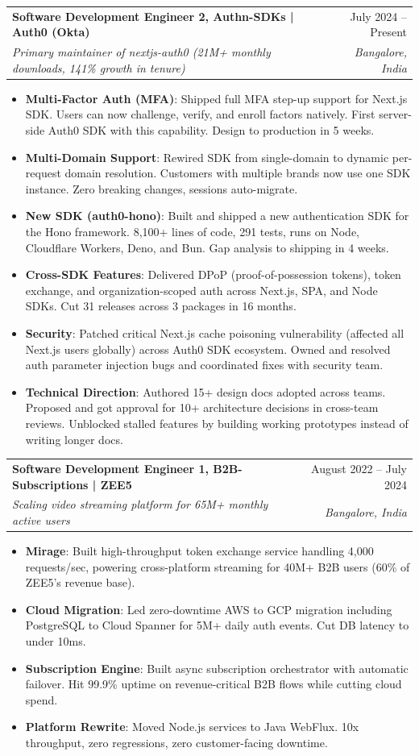 \documentclass[letterpaper,10pt]{article}
\makeatletter
\newcommand{\resumeItem}[1]{
  \item\small{
{#1 \vspace{-1pt}}
  }
}
\newcommand{\resumeSubheading}[4]{
  \vspace{3pt}\item
\begin{tabular*}{0.97\textwidth}[t]{l@{\extracolsep{\fill}}r}
  \textbf{#1} & #2 \\
  \textit{\small#3} & \textit{\small #4} \\
\end{tabular*}\vspace{-7pt}
}
\newcommand{\resumeItemListStart}{\begin{itemize}}
\newcommand{\resumeItemListEnd}{\end{itemize}\vspace{-8pt}}
\makeatother
\begin{document}
    \resumeSubheading
  {Software Development Engineer 2, Authn-SDKs | Auth0 (Okta)}{July 2024 -- Present}
  {Primary maintainer of nextjs-auth0 (21M+ monthly downloads, 141\% growth in tenure)}{Bangalore, India}
  \resumeItemListStart
    \resumeItem{\textbf{Multi-Factor Auth (MFA)}: Shipped full MFA step-up support for Next.js SDK. Users can now challenge, verify, and enroll factors natively. First server-side Auth0 SDK with this capability. Design to production in 5 weeks.}
    \resumeItem{\textbf{Multi-Domain Support}: Rewired SDK from single-domain to dynamic per-request domain resolution. Customers with multiple brands now use one SDK instance. Zero breaking changes, sessions auto-migrate.}
    \resumeItem{\textbf{New SDK (auth0-hono)}: Built and shipped a new authentication SDK for the Hono framework. 8,100+ lines of code, 291 tests, runs on Node, Cloudflare Workers, Deno, and Bun. Gap analysis to shipping in 4 weeks.}
    \resumeItem{\textbf{Cross-SDK Features}: Delivered DPoP (proof-of-possession tokens), token exchange, and organization-scoped auth across Next.js, SPA, and Node SDKs. Cut 31 releases across 3 packages in 16 months.}
    \resumeItem{\textbf{Security}: Patched critical Next.js cache poisoning vulnerability (affected all Next.js users globally) across Auth0 SDK ecosystem. Owned and resolved auth parameter injection bugs and coordinated fixes with security team.}
    \resumeItem{\textbf{Technical Direction}: Authored 15+ design docs adopted across teams. Proposed and got approval for 10+ architecture decisions in cross-team reviews. Unblocked stalled features by building working prototypes instead of writing longer docs.}
  \resumeItemListEnd

    \resumeSubheading
  {Software Development Engineer 1, B2B-Subscriptions | ZEE5}{August 2022 -- July 2024}
  {Scaling video streaming platform for 65M+ monthly active users}{Bangalore, India}
  \resumeItemListStart
    \resumeItem{\textbf{Mirage}: Built high-throughput token exchange service handling 4,000 requests/sec, powering cross-platform streaming for 40M+ B2B users (60\% of ZEE5's revenue base).}
    \resumeItem{\textbf{Cloud Migration}: Led zero-downtime AWS to GCP migration including PostgreSQL to Cloud Spanner for 5M+ daily auth events. Cut DB latency to under 10ms.}
    \resumeItem{\textbf{Subscription Engine}: Built async subscription orchestrator with automatic failover. Hit 99.9\% uptime on revenue-critical B2B flows while cutting cloud spend.}
    \resumeItem{\textbf{Platform Rewrite}: Moved Node.js services to Java WebFlux. 10x throughput, zero regressions, zero customer-facing downtime.}
  \resumeItemListEnd
\end{document}
